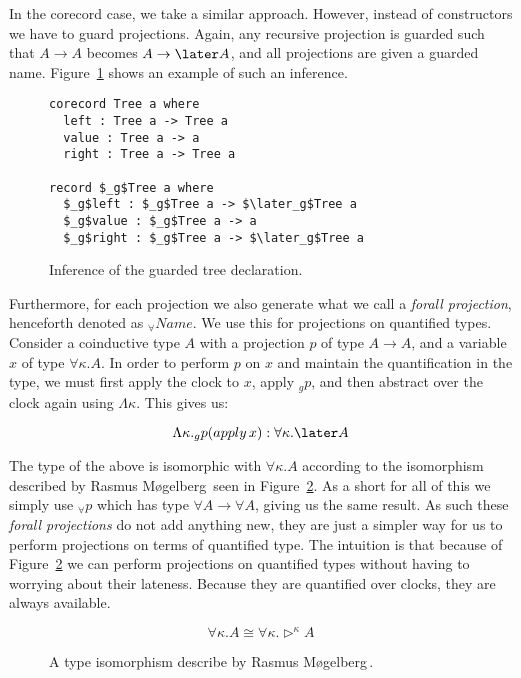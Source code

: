 In the corecord case, we take a similar approach. However, instead of
constructors we have to guard projections. Again, any recursive projection is
guarded such that $A \rightarrow A$ becomes $A \rightarrow \later A$, and all
projections are given a guarded name. Figure~\ref{fig:guarded_tree_inf} shows an
example of such an inference.

\begin{figure}[h]
\begin{lstlisting}[mathescape]
corecord Tree a where
  left : Tree a -> Tree a
  value : Tree a -> a
  right : Tree a -> Tree a

record $_g$Tree a where
  $_g$left : $_g$Tree a -> $\later_g$Tree a
  $_g$value : $_g$Tree a -> a
  $_g$right : $_g$Tree a -> $\later_g$Tree a
\end{lstlisting}
  \caption{Inference of the guarded tree declaration.}
  \label{fig:guarded_tree_inf}
\end{figure}

Furthermore, for each projection we also generate what we call a \emph{forall
  projection}, henceforth denoted as $_\forall Name$. We use this for
projections on quantified types. Consider a coinductive type $A$ with a
projection $p$ of type $A \rightarrow A$, and a variable $x$ of type $\forall
\kappa.A$. In order to perform $p$ on $x$ and maintain the quantification in the
type, we must first apply the clock to $x$, apply $_gp$, and then abstract over the
clock again using $\Lambda \kappa$. This gives us:

\[
\Lambda \kappa . _gp (apply\,x) : \forall \kappa . \later A
\]

The type of the above is isomorphic with $\forall \kappa . A$ according to the
isomorphism described by Rasmus M\o gelberg\,\cite{Mogelberg:2014} seen in
Figure~\ref{fig:quantified_later_iso}. As a short for all of this we simply use
$_\forall p$ which has type $\forall A \rightarrow \forall A$, giving us the
same result. As such these \emph{forall projections} do not add anything new,
they are just a simpler way for us to perform projections on terms of quantified
type. The intuition is that because of Figure~\ref{fig:quantified_later_iso} we
can perform projections on quantified types without having to worrying about
their lateness. Because they are quantified over clocks, they are always available.

\begin{figure}[h]
\[
\forall \kappa .A\cong \forall \kappa .\rhd ^\kappa A
\]
  \caption{A type isomorphism describe by Rasmus M\o gelberg\,\cite{Mogelberg:2014}.}
  \label{fig:quantified_later_iso}
\end{figure}

